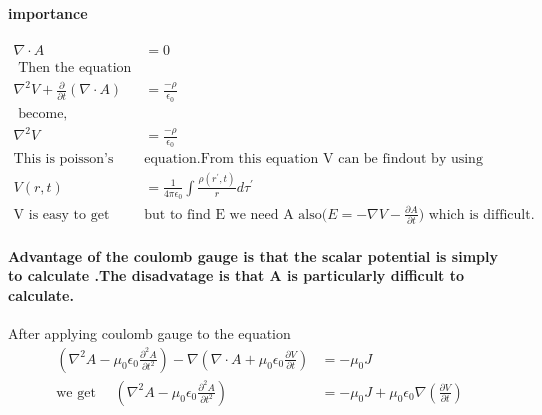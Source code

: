 \paragraph{importance}
\begin{align*}
\nabla \cdot A&=0\\
\text{ Then the equation }\\
\nabla ^2V+\frac{\partial }{\partial t}(\nabla \cdot A)&=\frac{-\rho}{\epsilon_{0}}\\
\text{ become,}\\
\nabla^2 V&=\frac{-\rho}{\epsilon_{0}}\\
\text{This is poisson's  }&\text{equation.From this equation V can be findout by using the formula}\\
V(r,t)&=\frac{1}{4 \pi \epsilon_0}\int \frac{\rho(r^{\prime},t)}{r}d\tau^{\prime}\\
\text{V is easy to get  }&\text{but to find E we need A also($E=-\nabla V-\frac{\partial A}{\partial t}$) which is difficult.}
\end{align*}
\paragraph{Advantage of the coulomb gauge is that the scalar potential is simply to calculate .The disadvatage is that  A is particularly difficult to calculate. }
After applying coulomb gauge to the equation 
\begin{align*}
\left( \nabla^2A-\mu_{0}\epsilon_{0}\frac{\partial^2 A}{\partial t^2}\right) -\nabla\left( \nabla \cdot A+\mu_{0}\epsilon_{0}\frac{\partial V}{\partial t}\right) &=-\mu_{0} J\\
\text{we get }\quad
\left( \nabla^2A-\mu_{0}\epsilon_{0}\frac{\partial^2 A}{\partial t^2}\right)&=-\mu_{0}J+\mu_{0} \epsilon_{0}\nabla \left( \frac{\partial V}{\partial t}\right) 
\end{align*}

